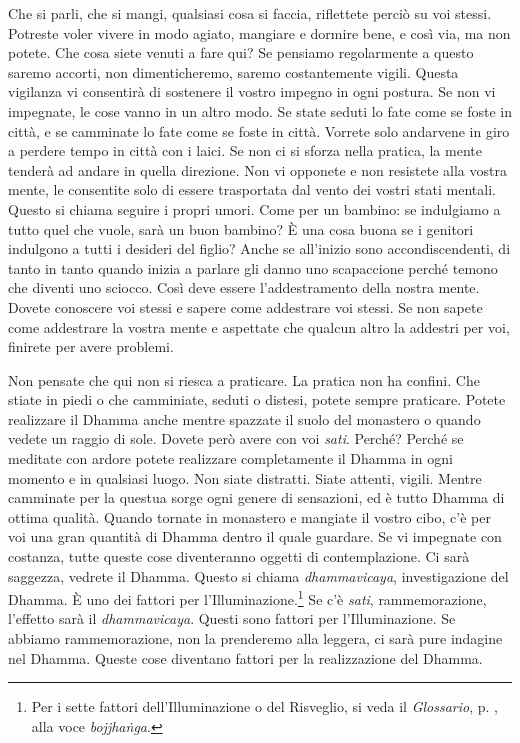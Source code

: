 Che si parli, che si mangi, qualsiasi cosa si faccia, riflettete perciò
su voi stessi. Potreste voler vivere in modo agiato, mangiare e dormire
bene, e così via, ma non potete. Che cosa siete venuti a fare qui? Se
pensiamo regolarmente a questo saremo accorti, non dimenticheremo,
saremo costantemente vigili. Questa vigilanza vi consentirà di sostenere
il vostro impegno in ogni postura. Se non vi impegnate, le cose vanno
in un altro modo. Se state seduti lo fate come se foste in città, e se
camminate lo fate come se foste in città. Vorrete solo andarvene in giro
a perdere tempo in città con i laici. Se non ci si sforza nella pratica,
la mente tenderà ad andare in quella direzione. Non vi opponete e non
resistete alla vostra mente, le consentite solo di essere trasportata
dal vento dei vostri stati mentali. Questo si chiama seguire i propri
umori. Come per un bambino: se indulgiamo a tutto quel che vuole, sarà
un buon bambino? È una cosa buona se i genitori indulgono a tutti i
desideri del figlio? Anche se all'inizio sono accondiscendenti, di tanto
in tanto quando inizia a parlare gli danno uno scapaccione perché temono
che diventi uno sciocco. Così deve essere l'addestramento della nostra
mente. Dovete conoscere voi stessi e sapere come addestrare voi stessi.
Se non sapete come addestrare la vostra mente e aspettate che qualcun
altro la addestri per voi, finirete per avere problemi.

Non pensate che qui non si riesca a praticare. La pratica non ha
confini. Che stiate in piedi o che camminiate, seduti o distesi, potete
sempre praticare. Potete realizzare il Dhamma anche mentre spazzate il
suolo del monastero o quando vedete un raggio di sole. Dovete però avere
con voi \emph{sati}. Perché? Perché se meditate con ardore potete
realizzare completamente il Dhamma in ogni momento e in qualsiasi luogo.
Non siate distratti. Siate attenti, vigili. Mentre camminate per la
questua sorge ogni genere di sensazioni, ed è tutto Dhamma di ottima
qualità. Quando tornate in monastero e mangiate il vostro cibo, c'è per
voi una gran quantità di Dhamma dentro il quale guardare. Se vi
impegnate con costanza, tutte queste cose diventeranno oggetti di
contemplazione. Ci sarà saggezza, vedrete il Dhamma. Questo si chiama
\emph{dhammavicaya}, investigazione del Dhamma. È uno dei fattori per
l'Illuminazione.\footnote{Per i sette fattori dell'Illuminazione o del
  Risveglio, si veda il \emph{Glossario}, p. \pageref{glossary-bojjhanga}, alla voce \emph{bojjhaṅga}.}
Se c'è \emph{sati}, rammemorazione, l'effetto sarà il
\emph{dhammavicaya}. Questi sono fattori per l'Illuminazione. Se abbiamo
rammemorazione, non la prenderemo alla leggera, ci sarà pure indagine
nel Dhamma. Queste cose diventano fattori per la realizzazione del
Dhamma.

